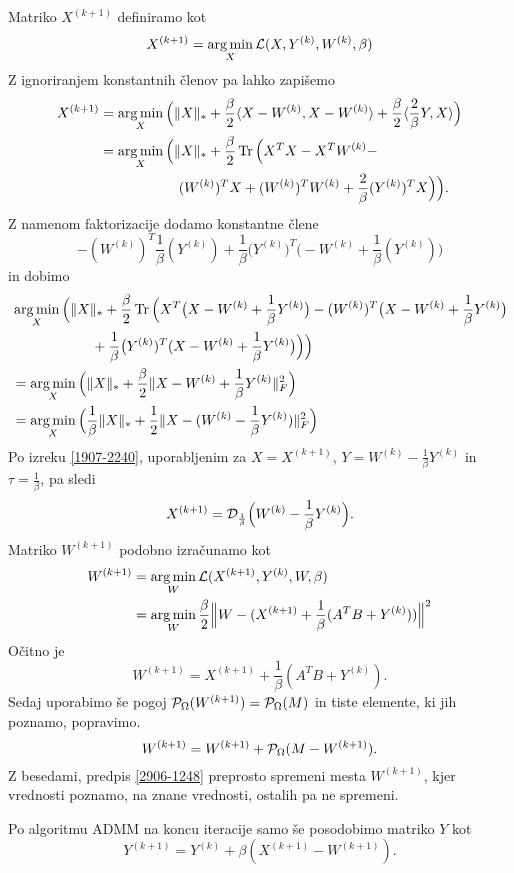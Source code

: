 Matriko $X^{(k+1)}$ definiramo kot
\[
    X^{(k+1)} = \operatorname*{arg\,min}_X \mathcal{L}(X, Y^{(k)}, W^{(k)}, \beta)
\]
Z ignoriranjem konstantnih členov pa lahko zapišemo
\begin{align*}
    X^{(k+1)} & = \operatorname*{arg\,min}_X \Big( \lVert X\rVert_* + \frac{\beta}{2}\langle X-W^{(k)}, X-W^{(k)} \rangle + \frac{\beta}{2}\langle \frac{2}{\beta}Y, X \rangle \Big) \\
              & = \operatorname*{arg\,min}_X \Big( \lVert X\rVert_* + \frac{\beta}{2}\operatorname{Tr}\Big(X^TX - X^TW^{(k)} -                                                   \\
              & \hspace{2cm} (W^{(k)})^TX + (W^{(k)})^TW^{(k)} + \frac{2}{\beta}(Y^{(k)})^TX \Big)\Big).
\end{align*}
Z namenom faktorizacije dodamo konstantne člene
\[-(W^{(k)})^T\frac{1}{\beta}(Y^{(k)}) + \frac{1}{\beta}\big(Y^{(k)}\big)^T\Big(-W^{(k)} + \frac{1}{\beta}(Y^{(k)})\Big)\]
in dobimo
\begin{align*}
     & \operatorname*{arg\,min}_X \Big( \lVert X\rVert_* + \frac{\beta}{2}\operatorname{Tr}\Big(X^T\big(X - W^{(k)} + \frac{1}{\beta}Y^{(k)}\big) - (W^{(k)})^T \big(X - W^{(k)} + \frac{1}{\beta}Y^{(k)}\big) \\
     & \hspace{2cm} +\frac{1}{\beta}\big(Y^{(k)})^T(X - W^{(k)} + \frac{1}{\beta}Y^{(k)}\big)\Big) \Big)                                                                 \\
     & = \operatorname*{arg\,min}_X \Big( \lVert X\rVert_* + \frac{\beta}{2} \lVert X-W^{(k)} + \frac{1}{\beta}Y^{(k)}\rVert_F^2 \Big)                                                                        \\
     & = \operatorname*{arg\,min}_X \Big( \frac{1}{\beta}\lVert X\rVert_* +  \frac{1}{2}\lVert X-(W^{(k)} - \frac{1}{\beta}Y^{(k)})\rVert_F^2\Big)  
\end{align*}
Po izreku \ref{1907-2240}, uporabljenim za $X=X^{(k+1)}$, $Y=W^{(k)} - \frac{1}{\beta}Y^{(k)}$ in $\tau=\frac{1}{\beta}$, pa sledi
\[
    X^{(k+1)} = \mathcal{D}_\frac{1}{\beta}\Big(W^{(k)} - \frac{1}{\beta} Y^{(k)}\Big).
\]
Matriko $W^{(k+1)}$ podobno izračunamo kot
\begin{align*}
    W^{(k+1)} & = \operatorname*{arg\,min}_{W} \mathcal{L}(X^{(k+1)}, Y^{(k)}, W, \beta)                                   \\
              & = \operatorname*{arg\,min}_W \frac{\beta}{2} \Big\|W - (X^{(k+1)} + \frac{1}{\beta}(A^T B + Y^{(k)})) \Big\|^2
\end{align*}
Očitno je
\[
    W^{(k+1)} = X^{(k+1)} + \frac{1}{\beta}(A^T B + Y^{(k)}).
\]
Sedaj uporabimo še pogoj $\mathcal{P}_\Omega(W^{(k+1)}) = \mathcal{P}_\Omega(M)$ in tiste elemente, ki jih poznamo, popravimo.
\begin{equation}
    \label{2906-1248}
    W^{(k+1)} = W^{(k+1)} + \mathcal{P}_\Omega(M - W^{(k+1)}).
\end{equation}
Z besedami, predpis \eqref{2906-1248}
preprosto spremeni mesta $W^{(k+1)}$, kjer vrednosti poznamo, na znane vrednosti, ostalih pa ne spremeni.

Po algoritmu ADMM \cite{admmForNNM} na koncu iteracije samo še posodobimo matriko $Y$ kot
\[
    Y^{(k+1)} = Y^{(k)} + \beta(X^{(k+1)}- W^{(k+1)}).
\]

